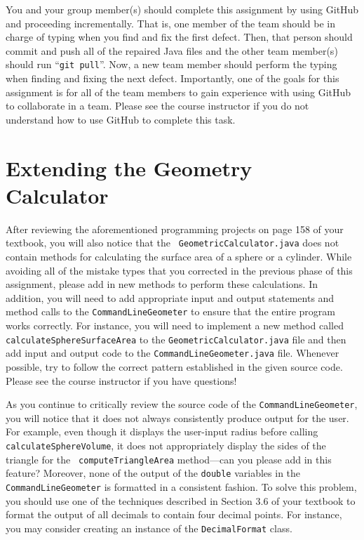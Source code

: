 \documentclass[11pt]{article}
\newcommand{\command}[1]{``\lstinline{#1}''}
\begin{document}
You and your group member(s) should complete this assignment by using GitHub and proceeding incrementally. That is, one
member of the team should be in charge of typing when you find and fix the first defect. Then, that person should commit
and push all of the repaired Java files and the other team member(s) should run \command{git pull}. Now, a new team
member should perform the typing when finding and fixing the next defect. Importantly, one of the goals for this
assignment is for all of the team members to gain experience with using GitHub to collaborate in a team. Please see the
course instructor if you do not understand how to use GitHub to complete this task.

\section*{Extending the Geometry Calculator}

\begin{sloppypar}
  After reviewing the aforementioned programming projects on page 158 of your textbook, you will also notice that the {\tt
  GeometricCalculator.java} does not contain methods for calculating the surface area of a sphere or a cylinder. While
  avoiding all of the mistake types that you corrected in the previous phase of this assignment, please add in new methods
  to perform these calculations. In addition, you will need to add appropriate input and output statements and method
  calls to the {\tt CommandLineGeometer} to ensure that the entire program works correctly. For instance, you will need to
  implement a new method called {\tt calculateSphereSurfaceArea} to the {\tt GeometricCalculator.java} file and then add
  input and output code to the {\tt CommandLineGeometer.java} file. Whenever possible, try to follow the correct
  pattern established in the given source code. Please see the course instructor if you have questions!
\end{sloppypar}

As you continue to critically review the source code of the {\tt CommandLineGeometer}, you will notice that it does not
always consistently produce output for the user. For example, even though it displays the user-input radius before
calling {\tt calculateSphereVolume}, it does not appropriately display the sides of the triangle for the {\tt
computeTriangleArea} method---can you please add in this feature? Moreover, none of the output of the {\tt double}
variables in the {\tt CommandLineGeometer} is formatted in a consistent fashion. To solve this problem, you should use
one of the techniques described in Section 3.6 of your textbook to format the output of all decimals to contain four
decimal points. For instance, you may consider creating an instance of the {\tt DecimalFormat} class.
\end{document}
